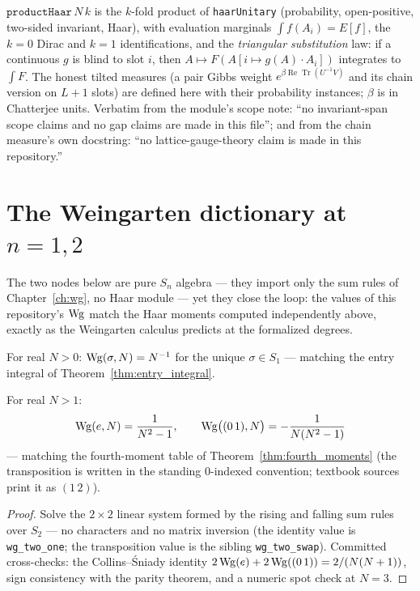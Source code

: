 \begin{definition}\label{def:product_haar}
\leanok
{}
$\texttt{productHaar}\,N\,k$ is the $k$-fold product of
\texttt{haarUnitary} (probability, open-positive, two-sided invariant,
Haar), with evaluation marginals
$\int f(A_{i})=E[f]$, the $k=0$ Dirac and $k=1$ identifications, and
the \emph{triangular substitution} law: if a continuous $g$ is blind
to slot $i$, then $A\mapsto F(A[i\mapsto g(A)\cdot A_{i}])$ integrates
to $\int F$. The honest tilted measures (a pair Gibbs weight
$e^{\beta\operatorname{Re}\operatorname{Tr}(U^{-1}V)}$ and its chain
version on $L+1$ slots) are defined here with their probability
instances; $\beta$ is in Chatterjee units. Verbatim from the module's
scope note: ``no invariant-span scope claims and no gap claims are
made in this file''; and from the chain measure's own docstring: ``no
lattice-gauge-theory claim is made in this repository.''
\end{definition}

\section{The Weingarten dictionary at
\texorpdfstring{$n=1,2$}{n=1,2}}\label{sec:wg_values}

The two nodes below are pure $S_{n}$ algebra --- they import only the
sum rules of Chapter~\ref{ch:wg}, no Haar module --- yet they close
the loop: the values of this repository's $\Wg$ match the Haar moments
computed independently above, exactly as the Weingarten calculus
predicts at the formalized degrees.

\begin{theorem}[$\Wg$ at $n=1$]\label{thm:wg_one}
\leanok
{}
For real $N>0$: $\operatorname{Wg}(\sigma,N)=N^{-1}$ for the unique
$\sigma\in S_{1}$ --- matching the entry integral of
Theorem~\ref{thm:entry_integral}.
\end{theorem}

\begin{theorem}[$\Wg$ at $n=2$]\label{thm:wg_two}
\leanok
{}
For real $N>1$:
\[
\operatorname{Wg}(e,N)=\frac1{N^{2}-1},\qquad
\operatorname{Wg}\bigl((0\,1),N\bigr)=-\frac1{N(N^{2}-1)}
\]
--- matching the fourth-moment table of
Theorem~\ref{thm:fourth_moments} (the transposition is written in the
standing $0$-indexed convention; textbook sources print it as
$(1\,2)$).
\end{theorem}
\begin{proof}
\leanok
{}
Solve the $2\times2$ linear system formed by the rising and falling
sum rules over $S_{2}$ --- no characters and no matrix inversion
(the identity value is \texttt{wg\_two\_one}; the transposition value
is the sibling \texttt{wg\_two\_swap}). Committed cross-checks: the Collins--\'Sniady identity
$2\operatorname{Wg}(e)+2\operatorname{Wg}((0\,1))=2/(N(N+1))$, sign consistency with the parity
theorem, and a numeric spot check at $N=3$.
\end{proof}

